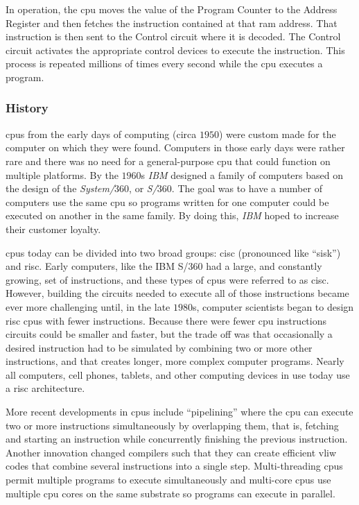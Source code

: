 In operation, the \gls{cpu} moves the value of the Program Counter to the Address Register and then fetches the instruction contained at that \gls{ram} address. That instruction is then sent to the Control circuit where it is decoded. The Control circuit activates the appropriate control devices to execute the instruction. This process is repeated millions of times every second while the \gls{cpu} executes a program.

\subsubsection{History}

\glspl{cpu} from the early days of computing (circa $ 1950 $) were custom made for the computer on which they were found. Computers in those early days were rather rare and there was no need for a general-purpose \gls{cpu} that could function on multiple platforms. By the $ 1960 $s \emph{IBM} designed a family of computers based on the design of the \emph{System/$ 360 $}, or \emph{S/$ 360 $}. The goal was to have a number of computers use the same \gls{cpu} so programs written for one computer could be executed on another in the same family. By doing this, \emph{IBM} hoped to increase their customer loyalty.

\glspl{cpu} today can be divided into two broad groups: \gls{cisc} (pronounced like ``sisk'') and \gls{risc}. Early computers, like the IBM S/$ 360 $ had a large, and constantly growing, set of instructions, and these types of \glspl{cpu} were referred to as \gls{cisc}. However, building the circuits needed to execute all of those instructions became ever more challenging until, in the late $ 1980 $s, computer scientists began to design \gls{risc} \glspl{cpu} with fewer instructions. Because there were fewer \gls{cpu} instructions circuits could be smaller and faster, but the trade off was that occasionally a desired instruction had to be simulated by combining two or more other instructions, and that creates longer, more complex computer programs. Nearly all computers, cell phones, tablets, and other computing devices in use today use a \gls{risc} architecture.

More recent developments in \glspl{cpu} include ``pipelining'' where the \gls{cpu} can execute two or more instructions simultaneously by overlapping them, that is, fetching and starting an instruction while concurrently finishing the previous instruction. Another innovation changed compilers such that they can create efficient \gls{vliw} codes that combine several instructions into a single step. Multi-threading \glspl{cpu} permit multiple programs to execute simultaneously and multi-core \glspl{cpu} use multiple \gls{cpu} cores on the same substrate so programs can execute in parallel. 

